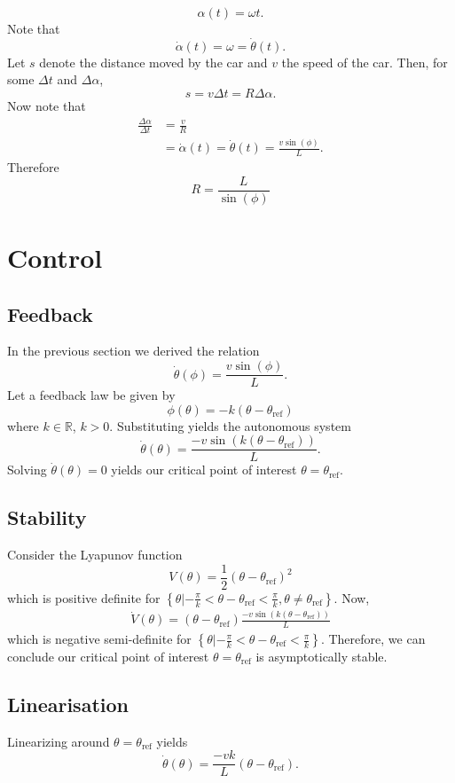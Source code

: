 \documentclass[11pt,titlepage]{report}
\begin{document}
\[
	\alpha(t) = \omega t.
\]
Note that
\[
	\dot{\alpha}(t) = \omega = \dot{\theta}(t).
\]
Let $s$ denote the distance moved by the car and $v$ the speed of the car. Then, for some $\Delta t$ and $\Delta \alpha$,
\[
	s = v \Delta t = R \Delta \alpha.
\]
Now note that
\begin{align*}
	\frac{\Delta \alpha}{\Delta t} &= \frac{v}{R} \\
	&=\dot{\alpha}(t)=\dot{\theta}(t) = \frac{v \sin{(\phi)}}{L}.
\end{align*}
Therefore
\begin{equation} \label{eq:steering-radius}
	R = \frac{L}{\sin{(\phi)}}
\end{equation}

\chapter*{Control}
\section*{Feedback}
In the previous section we derived the relation
\[
	\dot{\theta}(\phi) = \frac{v \sin{(\phi)}}{L}.
\]
Let a feedback law be given by
\[
	\phi(\theta) = -k(\theta-\theta_{\text{ref}})
\]
where $k \in \mathbb{R}$, $k > 0$. Substituting yields the autonomous system
\[
	\dot{\theta}(\theta) = \frac{- v \sin{(k (\theta-\theta_{\text{ref}}))}}{L}.
\]
Solving $\dot{\theta}(\theta)=0$ yields our critical point of interest $\theta=\theta_{\text{ref}}$.

\section*{Stability}
Consider the Lyapunov function
\[
	V(\theta) = \frac{1}{2}(\theta-\theta_{\text{ref}})^2
\]
which is positive definite for $\left\{\theta | -\frac{\pi}{k} < \theta-\theta_{\text{ref}} < \frac{\pi}{k}, \theta \neq \theta_{\text{ref}} \right\}$. Now,
\begin{align*}
	\dot{V}(\theta) = (\theta-\theta_{\text{ref}}) \frac{- v \sin{(k ({\theta-\theta_{\text{ref}}}))}}{L}
\end{align*}
which is negative semi-definite for $\left\{\theta | -\frac{\pi}{k} < \theta-\theta_{\text{ref}} < \frac{\pi}{k}\right\}$. Therefore, we can conclude our critical point of interest $\theta=\theta_{\text{ref}}$ is asymptotically stable.

\section*{Linearisation}
Linearizing around $\theta=\theta_{\text{ref}}$ yields
\[
	\dot{\theta}(\theta) = \frac{- v k}{L} (\theta-\theta_{\text{ref}}).
\]
\end{document}
